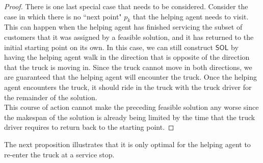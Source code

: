 \documentclass[12pt]{scrartcl}
\begin{document}
\begin{proof}
\noindent There is one last special case that needs to be considered. Consider the case in which there is no ``next point" $p_k$ that the helping agent needs to visit. This can happen when the helping agent has finished servicing the subset of customers that it was assigned by a feasible solution, and it has returned to the initial starting point on its own. In this case, we can still construct $\mathsf{SOL}$ by having the helping agent walk in the direction that is opposite of the direction that the truck is moving in. Since the truck cannot move in both directions, we are guaranteed that the helping agent will encounter the truck. Once the helping agent encounters the truck, it should ride in the truck with the truck driver for the remainder of the solution. \\

This course of action cannot make the preceding feasible solution any worse since the makespan of the solution is already being limited by the time that the truck driver requires to return back to the starting point. 
\end{proof}

\iffalse
\begin{proposition}
It is never advantageous for the helping agent to walk in the direction opposite to that which that the truck is moving in. 
\end{proposition}
\begin{proof}
TODO. 
\end{proof}
\fi

The next proposition illustrates that it is only optimal for the helping agent to re-enter the truck at a service stop. 
\end{document}
